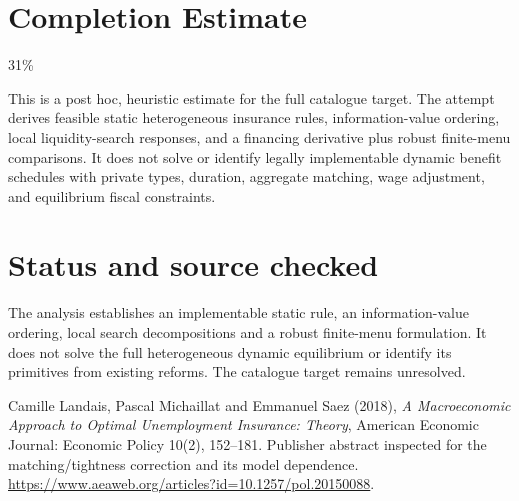 \documentclass[11pt]{article}
\begin{document}
\section{Completion Estimate}
31\%

This is a post hoc, heuristic estimate for the full catalogue target.
The attempt derives feasible static heterogeneous insurance rules, information-value ordering, local liquidity-search responses, and a financing derivative plus robust finite-menu comparisons. It does not solve or identify legally implementable dynamic benefit schedules with private types, duration, aggregate matching, wage adjustment, and equilibrium fiscal constraints.

\section*{Status and source checked}
The analysis establishes an implementable static rule, an information-value ordering, local search decompositions and a robust finite-menu formulation. It does not solve the full heterogeneous dynamic equilibrium or identify its primitives from existing reforms. The catalogue target remains unresolved.

Camille Landais, Pascal Michaillat and Emmanuel Saez (2018), \emph{A Macroeconomic Approach to Optimal Unemployment Insurance: Theory}, American Economic Journal: Economic Policy 10(2), 152--181. Publisher abstract inspected for the matching/tightness correction and its model dependence. \url{https://www.aeaweb.org/articles?id=10.1257/pol.20150088}.
\end{document}
